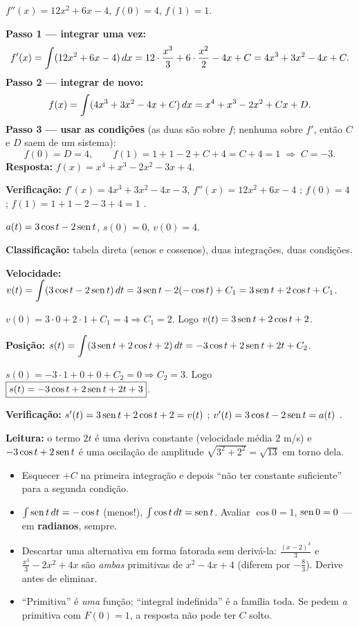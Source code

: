 \begin{exemplo}
$f''(x)=12x^2+6x-4$, \quad $f(0)=4$, \quad $f(1)=1$.

\textbf{Passo 1 --- integrar uma vez:}
\[
f'(x)=\int(12x^2+6x-4)\,dx = 12\cdot\frac{x^3}{3}+6\cdot\frac{x^2}{2}-4x + C = 4x^3+3x^2-4x+C .
\]
\textbf{Passo 2 --- integrar de novo:}
\[
f(x)=\int(4x^3+3x^2-4x+C)\,dx = x^4 + x^3 - 2x^2 + Cx + D .
\]
\textbf{Passo 3 --- usar as condições} (as duas são sobre $f$; nenhuma sobre $f'$, então $C$ e $D$ saem de um sistema):
\[
f(0)=D=4 ,\qquad f(1)=1+1-2+C+4 = C+4 = 1 \;\Rightarrow\; C=-3 .
\]
\textbf{Resposta:} $f(x)=x^4+x^3-2x^2-3x+4$.

\textbf{Verificação:} $f'(x)=4x^3+3x^2-4x-3$, $f''(x)=12x^2+6x-4$ \ok; $f(0)=4$ \ok; $f(1)=1+1-2-3+4=1$ \ok.
\end{exemplo}

\begin{exemplo}
$a(t)=3\cos t-2\operatorname{sen} t$, \quad $s(0)=0$, \quad $v(0)=4$.

\textbf{Classificação:} tabela direta (senos e cossenos), duas integrações, duas condições.

\textbf{Velocidade:} $v(t)=\displaystyle\int(3\cos t-2\operatorname{sen} t)\,dt = 3\operatorname{sen} t - 2(-\cos t) + C_1 = 3\operatorname{sen} t + 2\cos t + C_1$.

$v(0)=3\cdot 0+2\cdot 1 + C_1 = 4 \Rightarrow C_1 = 2$. Logo $v(t)=3\operatorname{sen} t+2\cos t+2$.

\textbf{Posição:} $s(t)=\displaystyle\int(3\operatorname{sen} t+2\cos t+2)\,dt = -3\cos t + 2\operatorname{sen} t + 2t + C_2$.

$s(0) = -3\cdot 1 + 0 + 0 + C_2 = 0 \Rightarrow C_2 = 3$. Logo $\boxed{s(t)=-3\cos t+2\operatorname{sen} t+2t+3}$.

\textbf{Verificação:} $s'(t)=3\operatorname{sen} t+2\cos t+2 = v(t)$ \ok; $v'(t)=3\cos t-2\operatorname{sen} t=a(t)$ \ok.

\textbf{Leitura:} o termo $2t$ é uma deriva constante (velocidade média $2$ m/s) e $-3\cos t+2\operatorname{sen} t$ é uma oscilação de amplitude $\sqrt{3^2+2^2}=\sqrt{13}$ em torno dela.
\end{exemplo}

\begin{armadilha}
\begin{itemize}[leftmargin=1.4em, itemsep=1pt]
\item Esquecer $+C$ na primeira integração e depois ``não ter constante suficiente'' para a segunda condição.
\item $\int\operatorname{sen} t\,dt = -\cos t$ (menos!), $\int\cos t\,dt=\operatorname{sen} t$. Avaliar $\cos 0 = 1$, $\operatorname{sen} 0=0$ --- em \textbf{radianos}, sempre.
\item Descartar uma alternativa em forma fatorada sem derivá-la: $\frac{(x-2)^3}{3}$ e $\frac{x^3}{3}-2x^2+4x$ são \emph{ambas} primitivas de $x^2-4x+4$ (diferem por $-\frac83$). Derive antes de eliminar.
\item ``Primitiva'' é \emph{uma} função; ``integral indefinida'' é a família toda. Se pedem \emph{a} primitiva com $F(0)=1$, a resposta não pode ter $C$ solto.
\end{itemize}
\end{armadilha}

